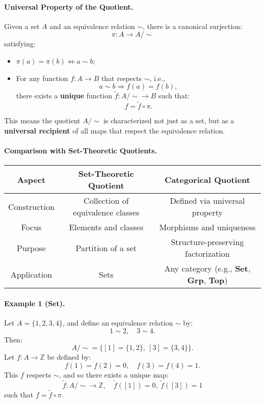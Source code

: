 \documentclass[10pt]{article}
\theoremstyle{plain}
\theoremstyle{definition}
\begin{document}
  \paragraph{Universal Property of the Quotient.}
  Given a set $A$ and an equivalence relation $\sim$, there is a canonical surjection:
  \[
  \pi : A \longrightarrow A/{\sim}
  \]
  satisfying:
  \begin{itemize}
  	\item $\pi(a) = \pi(b) \iff a \sim b$;
  	\item For any function $f : A \to B$ that respects $\sim$, i.e.,
  	\[
  	a \sim b \Rightarrow f(a) = f(b),
  	\]
  	there exists a \textbf{unique} function $\tilde{f} : A/{\sim} \to B$ such that:
  	\[
  	f = \tilde{f} \circ \pi.
  	\]
  \end{itemize}
  
  This means the quotient $A/{\sim}$ is characterized not just as a set, but as a \textbf{universal recipient} of all maps that respect the equivalence relation.
  
  \paragraph{Comparison with Set-Theoretic Quotients.}
  \begin{center}
  	\begin{tabular}{|c|c|c|}
  		\hline
  		\textbf{Aspect} & \textbf{Set-Theoretic Quotient} & \textbf{Categorical Quotient} \\
  		\hline
  		Construction & Collection of equivalence classes & Defined via universal property \\
  		\hline
  		Focus & Elements and classes & Morphisms and uniqueness \\
  		\hline
  		Purpose & Partition of a set & Structure-preserving factorization \\
  		\hline
  		Application & Sets & Any category (e.g., \textbf{Set}, \textbf{Grp}, \textbf{Top}) \\
  		\hline
  	\end{tabular}
  \end{center}
  
  \paragraph{Example 1 (Set).}
  Let $A = \{1, 2, 3, 4\}$, and define an equivalence relation $\sim$ by:
  \[
  1 \sim 2,\quad 3 \sim 4.
  \]
  Then:
  \[
  A/{\sim} = \{ [1] = \{1, 2\},\ [3] = \{3, 4\} \}.
  \]
  Let $f : A \to \mathbb{Z}$ be defined by:
  \[
  f(1) = f(2) = 0,\quad f(3) = f(4) = 1.
  \]
  This $f$ respects $\sim$, and so there exists a unique map:
  \[
  \tilde{f} : A/{\sim} \to \mathbb{Z},\quad \tilde{f}([1]) = 0,\ \tilde{f}([3]) = 1
  \]
  such that $f = \tilde{f} \circ \pi$.
  
\end{document}
